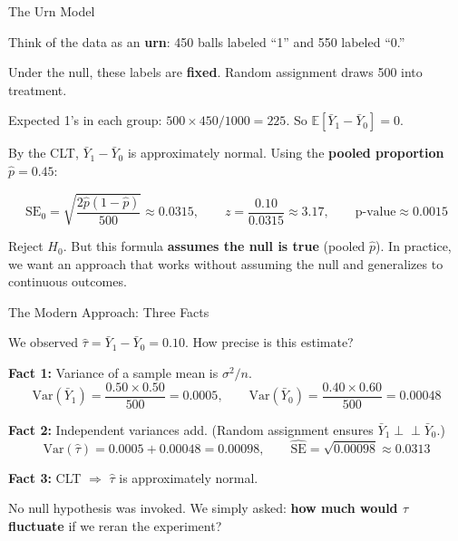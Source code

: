 \documentclass[aspectratio=169, 11pt, handout]{beamer}
\newcommand{\E}{\mathbb{E}}
\newcommand{\Var}{\mathrm{Var}}
\newcommand{\SE}{\mathrm{SE}}
\newcommand{\indep}{\perp\!\!\!\perp}
\begin{document}
\begin{frame}{The Urn Model}

Think of the data as an \textbf{urn}: 450 balls labeled ``1'' and 550 labeled ``0.''

\bigskip

Under the null, these labels are \textbf{fixed}. Random assignment draws 500 into treatment.

\bigskip

Expected 1's in each group: $500 \times 450/1000 = 225$. So $\E[\bar{Y}_1 - \bar{Y}_0] = 0$.

\bigskip
\pause

By the CLT, $\bar{Y}_1 - \bar{Y}_0$ is approximately normal. Using the \textbf{pooled proportion} $\hat{p} = 0.45$:

\[
\SE_0 = \sqrt{\frac{2\hat{p}(1-\hat{p})}{500}} \approx 0.0315, \qquad z = \frac{0.10}{0.0315} \approx 3.17, \qquad \text{p-value} \approx 0.0015
\]

\bigskip

Reject $H_0$. But this formula \textbf{assumes the null is true} (pooled $\hat{p}$). In practice, we want an approach that works without assuming the null and generalizes to continuous outcomes.
\end{frame}

\begin{frame}{The Modern Approach: Three Facts}

We observed $\hat{\tau} = \bar{Y}_1 - \bar{Y}_0 = 0.10$. How precise is this estimate?

\bigskip

\textbf{Fact 1:} Variance of a sample mean is $\sigma^2 / n$.
\[
\Var(\bar{Y}_1) = \frac{0.50 \times 0.50}{500} = 0.0005, \qquad \Var(\bar{Y}_0) = \frac{0.40 \times 0.60}{500} = 0.00048
\]

\pause

\textbf{Fact 2:} Independent variances add. (Random assignment ensures $\bar{Y}_1 \indep \bar{Y}_0$.)
\[
\Var(\hat{\tau}) = 0.0005 + 0.00048 = 0.00098, \qquad \widehat{\SE} = \sqrt{0.00098} \approx 0.0313
\]

\pause

\textbf{Fact 3:} CLT $\Rightarrow$ $\hat{\tau}$ is approximately normal.

\bigskip

No null hypothesis was invoked. We simply asked: \textbf{how much would $\hat{\tau}$ fluctuate} if we reran the experiment?
\end{frame}
\end{document}
